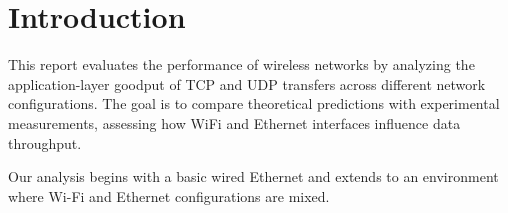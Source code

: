 \section{Introduction}

This report evaluates the performance of wireless networks by analyzing the application-layer goodput of TCP and UDP transfers across different network configurations. The goal is to compare theoretical predictions with experimental measurements, assessing how WiFi and Ethernet interfaces influence data throughput.

\noindent Our analysis begins with a basic wired Ethernet and extends to an environment where Wi-Fi and Ethernet configurations are mixed.